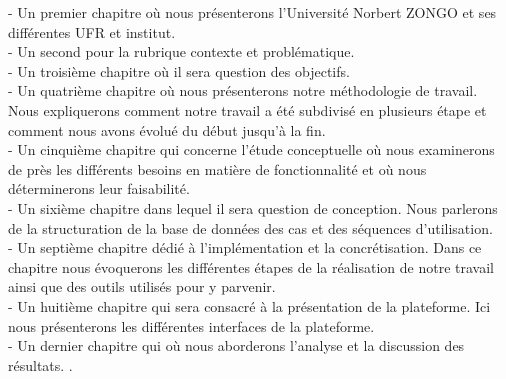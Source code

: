 -	Un premier chapitre où nous présenterons l’Université Norbert ZONGO et ses différentes UFR et institut.\\
-	Un second pour la rubrique contexte et problématique.  \\
-	Un troisième chapitre où il sera question des objectifs.\\
-	Un quatrième chapitre où nous présenterons notre méthodologie de travail. Nous expliquerons comment notre travail a été subdivisé en plusieurs étape et comment nous avons évolué du début jusqu’à la fin.\\
-	Un cinquième chapitre qui concerne l’étude conceptuelle où nous examinerons de près les différents besoins en matière de fonctionnalité et où nous déterminerons leur faisabilité.\\
-	Un sixième chapitre dans lequel il sera question de conception. Nous parlerons de la structuration de la base de données des cas et des séquences d’utilisation.\\
-	Un septième chapitre dédié à l’implémentation et la concrétisation. Dans ce chapitre nous évoquerons les différentes étapes de la réalisation de notre travail ainsi que des outils utilisés pour y parvenir.\\
-	Un huitième chapitre qui sera consacré à la présentation de la plateforme. Ici nous présenterons les différentes interfaces de la plateforme.\\
-	Un dernier chapitre qui où nous aborderons l’analyse et la discussion des résultats.
.\par

